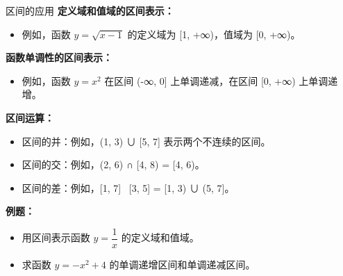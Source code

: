 \documentclass[aspectratio=169]{ctexbeamer} %
\begin{document}
\begin{frame}{区间的应用}
    \vspace{0.5cm}
    \textbf{定义域和值域的区间表示：}
    \begin{itemize}
        \item 例如，函数 \( y = \sqrt{x - 1} \) 的定义域为 [1, +∞)，值域为 [0, +∞)。
    \end{itemize}

    \vspace{0.5cm}
    \textbf{函数单调性的区间表示：}
    \begin{itemize}
        \item 例如，函数 \( y = x^2 \) 在区间 (-∞, 0] 上单调递减，在区间 [0, +∞) 上单调递增。
    \end{itemize}

    \vspace{0.5cm}
    \textbf{区间运算：}
    \begin{itemize}
        \item 区间的并：例如，(1, 3) ∪ [5, 7] 表示两个不连续的区间。
        \item 区间的交：例如，(2, 6) ∩ [4, 8) = [4, 6)。
        \item 区间的差：例如，[1, 7] \ [3, 5] = [1, 3) ∪ (5, 7]。
    \end{itemize}

    \vspace{0.5cm}
    \textbf{例题：}
    \begin{itemize}
        \item 用区间表示函数 \( y = \dfrac{1}{x} \) 的定义域和值域。
        \item 求函数 \( y = -x^2 + 4 \) 的单调递增区间和单调递减区间。
    \end{itemize}
\end{frame}

\end{document}
